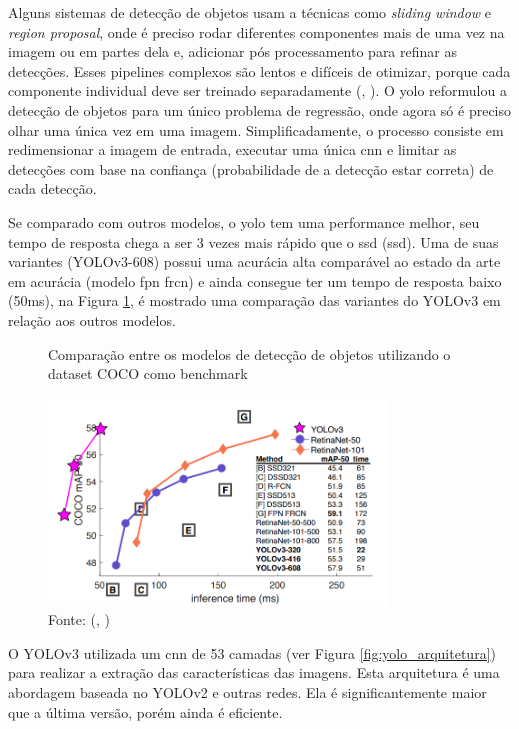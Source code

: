 \documentclass[]{politex}
\begin{document}
Alguns sistemas de detecção de objetos usam a técnicas como \textit{sliding window} e \textit{region proposal}, onde é preciso rodar diferentes componentes mais de uma vez na imagem ou em partes dela e, adicionar pós processamento para refinar as detecções. Esses pipelines complexos são lentos e difíceis de otimizar, porque cada componente individual deve ser treinado separadamente (, \citeyear{yolov1}). O \acrshort{yolo} reformulou a detecção de objetos para um único problema de regressão, onde agora só é preciso olhar uma única vez em uma imagem. Simplificadamente, o processo consiste em redimensionar a imagem de entrada, executar uma única \acrshort{cnn} e limitar as detecções com base na confiança (probabilidade de a detecção estar correta) de cada detecção.

Se comparado com outros modelos, o \acrshort{yolo} tem uma performance melhor, seu tempo de resposta chega a ser 3 vezes mais rápido que o \acrshort{ssd} (\acrlong{ssd}). Uma de suas variantes (YOLOv3-608) possui uma acurácia alta comparável ao estado da arte em acurácia (modelo \acrshort{fpn} \acrshort{frcn}) e ainda consegue ter um tempo de resposta baixo (50ms), na Figura \ref{fig:yolo_comparacao}, é mostrado uma comparação das variantes do YOLOv3 em relação aos outros modelos.

\begin{figure}[H]
    \centering
    \caption{Comparação entre os modelos de detecção de objetos utilizando o dataset COCO como benchmark}
    \includegraphics[width=0.8\textwidth]{yolov3_comparacao}
    \caption*{Fonte: (, \citeyear{yolov3})}
    \label{fig:yolo_comparacao}
\end{figure}

O YOLOv3 utilizada um \acrshort{cnn} de 53 camadas (ver Figura \ref{fig:yolo_arquitetura}) para realizar a extração das características das imagens. Esta arquitetura é uma abordagem baseada no YOLOv2 e outras redes. Ela é significantemente maior que a última versão, porém ainda é eficiente.
\end{document}
